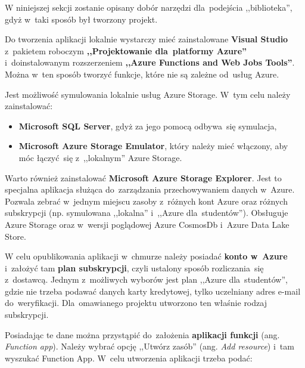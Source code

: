 \documentclass[12pt,a4paper,twoside,titlepage,openright]{book}
\begin{document}
W niniejszej sekcji zostanie opisany dobór narzędzi dla~podejścia ,,biblioteka'', gdyż w~taki sposób był tworzony projekt.

Do tworzenia aplikacji lokalnie wystarczy mieć zainstalowane \textbf{Visual Studio} z~pakietem roboczym \textbf{,,Projektowanie dla~platformy Azure''} i~doinstalowanym rozszerzeniem \textbf{,,Azure Functions and Web Jobs Tools''}. Można w~ten sposób tworzyć funkcje, które nie są zależne od~usług Azure.

Jest możliwość symulowania lokalnie usług Azure Storage. W~tym celu należy zainstalować:
\begin{itemize}
\item \textbf{Microsoft SQL Server}, gdyż za jego pomocą odbywa~się symulacja,
\item \textbf{Microsoft Azure Storage Emulator}, który należy mieć włączony, aby móc łączyć~się z~,,lokalnym'' Azure Storage.
\end{itemize}

Warto również zainstalować \textbf{Microsoft Azure Storage Explorer}. Jest to specjalna aplikacja służąca do~zarządzania przechowywaniem danych w~Azure. Pozwala zebrać w~jednym miejscu zasoby z~różnych kont Azure oraz różnych subskrypcji (np. symulowana ,,lokalna'' i~,,Azure dla~studentów''). Obsługuje Azure Storage oraz w~wersji poglądowej Azure CosmosDb i~Azure Data Lake Store.

W celu opublikowania aplikacji w~chmurze należy posiadać \textbf{konto w~Azure} i~założyć tam \textbf{plan subskrypcji}, czyli ustalony sposób rozliczania~się z~dostawcą. Jednym z~możliwych wyborów jest plan ,,Azure dla~studentów'', gdzie nie trzeba podawać danych karty kredytowej, tylko uczelniany adres e-mail do~weryfikacji. Dla~omawianego projektu utworzono ten właśnie rodzaj subskrypcji. 

Posiadając te dane można przystąpić do~założenia \textbf{aplikacji funkcji} (ang. \textit{Function app}). Należy wybrać opcję ,,Utwórz zasób'' (ang. \textit{Add resource}) i~tam wyszukać Function App. W~celu utworzenia aplikacji trzeba podać:
\end{document}
